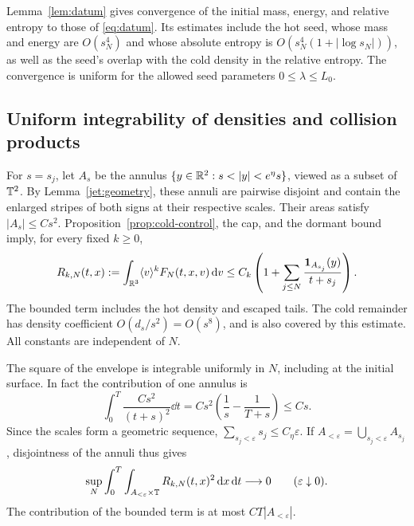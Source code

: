 Lemma~\ref{lem:datum} gives convergence of the initial mass, energy,
and relative entropy to those of \eqref{eq:datum}. Its estimates include
the hot seed, whose mass and energy are \(O(s_N^4)\) and whose absolute
entropy is \(O(s_N^4(1+|\log s_N|))\), as well as the seed's overlap
with the cold density in the relative entropy. The convergence is
uniform for the allowed seed parameters \(0\leq\lambda\leq L_0\).

\subsection{Uniform integrability of densities and collision products}

For \(s=s_j\), let \(A_s\) be the annulus
\(\{y\in\R^2:s<|y|<e^\eta s\}\), viewed as a subset of \(\mathbb T^2\).
By Lemma~\ref{jet:geometry}, these annuli are pairwise disjoint and
contain the enlarged stripes of both signs at their respective scales.
Their areas satisfy \(|A_s|\leq Cs^2\). Proposition~\ref{prop:cold-control},
the cap, and the dormant bound imply, for every fixed \(k\geq0\),
\begin{equation}\label{comp:moment-envelope}
R_{k,N}(t,x):=\int_{\mathbb R^3}\langle v\rangle^kF_N(t,x,v)\,\mathrm d v
\leq C_k\left(1+\sum_{j\leq N}
                  \frac{\mathbf 1_{A_{s_j}}(y)}{t+s_j}\right).
\end{equation}
The bounded term includes the hot density and escaped tails. The cold
remainder has density coefficient \(O(d_s/s^2)=O(s^8)\), and is
also covered by this estimate. All constants are independent of \(N\).

The square of the envelope is integrable uniformly in \(N\), including
at the initial surface. In fact the contribution of one annulus is
\begin{equation}\label{comp:annular-square}
\int_0^T\frac{Cs^2}{(t+s)^2}\dd t
=Cs^2\left(\frac1s-\frac1{T+s}\right)\leq Cs.
\end{equation}
Since the scales form a geometric sequence,
\(\sum_{s_j<\varepsilon}s_j\leq C_\eta\varepsilon\). If
\(A_{<\varepsilon}=\bigcup_{s_j<\varepsilon}A_{s_j}\), disjointness
of the annuli thus gives
\begin{equation}\label{comp:small-annuli}
\sup_N\int_0^T\int_{A_{<\varepsilon}\times\mathbb T}
                 R_{k,N}(t,x)^2\,\mathrm d x\,\mathrm d t\longrightarrow0
\qquad(\varepsilon\downarrow0).
\end{equation}
The contribution of the bounded term is at most
\(C T|A_{<\varepsilon}|\).


